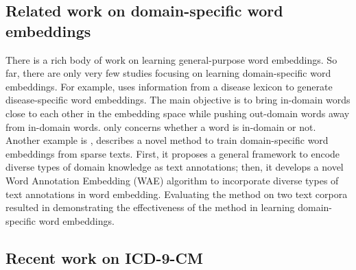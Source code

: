 \subsection{Related work on domain-specific word embeddings}

There is a rich body of work on learning general-purpose word embeddings. So far, there are only very few studies focusing on learning domain-specific word embeddings. For example, \citeauthor{ghosh2016designing} \citeyear{ghosh2016designing} \cite{ghosh2016designing} uses information from a disease lexicon to generate disease-specific word embeddings. The main objective is to bring in-domain words close to each other in the embedding space while pushing out-domain words away from in-domain words. \citeauthor{ghosh2016designing} \citeyear{ghosh2016designing} \cite{ghosh2016designing} only concerns whether a word is in-domain or not.
Another example is \citeauthor{domainSpecificWordEmbedding} \citeyear{domainSpecificWordEmbedding} \cite{domainSpecificWordEmbedding}, describes a novel method to train domain-specific word embeddings from sparse texts. First, it proposes a general framework to encode diverse types of domain knowledge as text annotations; then, it develops a novel Word Annotation Embedding (WAE) algorithm to incorporate diverse types of text annotations in word embedding. Evaluating the method on two text corpora resulted in demonstrating the effectiveness of the method in learning domain-specific word embeddings.

\subsection{Recent work on ICD-9-CM}

